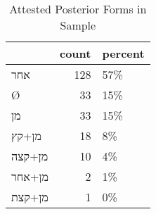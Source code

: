 \begin{table}[htbp!]
\centering
\caption{Attested Posterior Forms in Sample}
\label{table:post_front}
\begin{tabular}{lrl}
\toprule
{} &  count & percent \\
\midrule
\texthebrew{אחר}    &    128 &     57\% \\
\texthebrew{Ø}      &     33 &     15\% \\
\texthebrew{מן}     &     33 &     15\% \\
\texthebrew{מן+קץ}  &     18 &      8\% \\
\texthebrew{מן+קצה} &     10 &      4\% \\
\texthebrew{מן+אחר} &      2 &      1\% \\
\texthebrew{מן+קצת} &      1 &      0\% \\
\bottomrule
\end{tabular}
\end{table}
